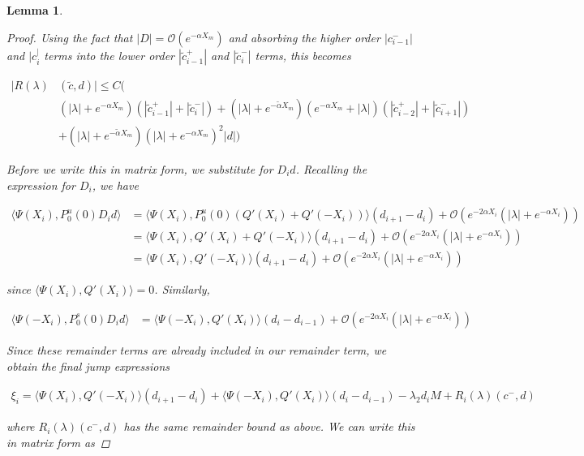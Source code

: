 \documentclass[12pt]{article}
\newtheorem{lemma}{Lemma}
\begin{document}
\begin{lemma}
\begin{proof}
Using the fact that $|D| = \mathcal{O}(e^{-\alpha X_m})$ and absorbing the higher order $|c_{i-1}^-|$ and $|c_i^|$ terms into the lower order $|\tilde{c}_{i-1}^+|$ and $|\tilde{c}_{i}^-|$ terms, this becomes

\begin{align*}
|R(\lambda)&(\tilde{c}, d)| \leq C \Big( \\
&(|\lambda| + e^{-\alpha X_m})(|\tilde{c}_{i-1}^+| + |\tilde{c}_{i}^-|) + (|\lambda| + e^{-\tilde{\alpha} X_m})(e^{-\alpha X_m} + |\lambda|) ( |\tilde{c}_{i-2}^+| + |\tilde{c}_{i+1}^-|)  \\
&+ (|\lambda| + e^{-\tilde{\alpha} X_m})(|\lambda| + e^{-\alpha X_m})^2 |d| \Big)
\end{align*}

Before we write this in matrix form, we substitute for $D_i d$. Recalling the expression for $D_i$, we have

\begin{align*}
\langle \Psi(X_i), P_0^u(0) D_i d \rangle
&= \langle \Psi(X_i), P_0^u(0) (Q'(X_i) + Q'(-X_i)) \rangle (d_{i+1} - d_i)
+\mathcal{O}(e^{-2 \alpha X_i}(|\lambda| + e^{-\alpha X_i})) \\
&= \langle \Psi(X_i), Q'(X_i) + Q'(-X_i) \rangle (d_{i+1} - d_i)
+\mathcal{O}(e^{-2 \alpha X_i}(|\lambda| + e^{-\alpha X_i})) \\
&= \langle \Psi(X_i), Q'(-X_i) \rangle (d_{i+1} - d_i)
+\mathcal{O}(e^{-2 \alpha X_i}(|\lambda| + e^{-\alpha X_i})) 
\end{align*}

since $\langle \Psi(X_i), Q'(X_i) \rangle = 0$. Similarly, 

\begin{align*}
\langle \Psi(-X_i), P_0^s(0) D_i d \rangle
&= \langle \Psi(-X_i), Q'(X_i) \rangle (d_i - d_{i-1})
+\mathcal{O}(e^{-2 \alpha X_i}(|\lambda| + e^{-\alpha X_i})) 
\end{align*}

Since these remainder terms are already included in our remainder term, we obtain the final jump expressions

\begin{align*}
\xi_i = \langle \Psi(X_i), Q'(-X_i) \rangle (d_{i+1} - d_i)
+ \langle \Psi(-X_i), Q'(X_i) \rangle (d_i - d_{i-1})
- \lambda_2 d_i M + R_i(\lambda)(c^-, d)
\end{align*}

where $R_i(\lambda)(c^-, d)$ has the same remainder bound as above. We can write this in matrix form as


\end{proof}
\end{lemma}
\end{document}
